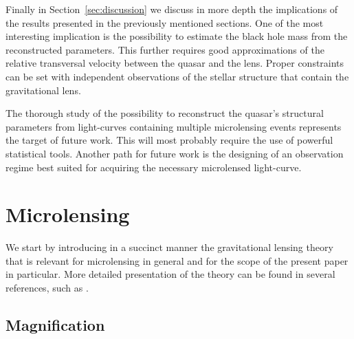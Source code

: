 \documentclass[usenatbib]{mn2e}
\begin{document}
Finally in Section~\ref{sec:discussion} we discuss in more depth the
implications of the results presented in the previously mentioned
sections.  One of the most interesting implication is the possibility
to estimate the black hole mass from the reconstructed
parameters. This further requires good approximations of the relative
transversal velocity between the quasar and the lens. Proper
constraints can be set with independent observations of the stellar
structure that contain the gravitational lens.

The thorough study of the possibility to reconstruct the quasar's
structural parameters from light-curves containing multiple
microlensing events represents the target of future work. This will
most probably require the use of powerful statistical tools. Another
path for future work is the designing of an observation regime best
suited for acquiring the necessary microlensed light-curve.


\section{Microlensing}\label{sec:microlensing}

We start by introducing in a succinct manner the gravitational lensing
theory that is relevant for microlensing in general and for the scope
of the present paper in particular.  More detailed presentation of the
theory can be found in several references, such as
\cite{2001stgl.book.....P}.

\subsection{Magnification}
\end{document}
